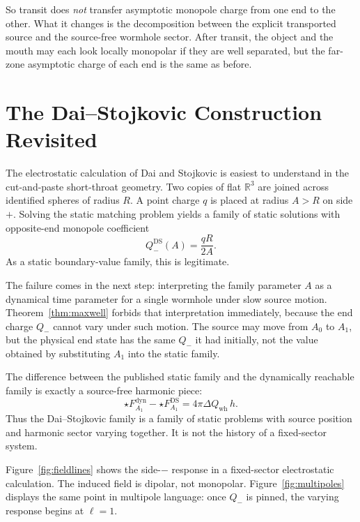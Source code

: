 \documentclass[aps,prd,onecolumn,nofootinbib,superscriptaddress]{revtex4-2}
\begin{document}
So transit does \emph{not} transfer asymptotic monopole charge from one end to the other. What it changes is the decomposition between the explicit transported source and the source-free wormhole sector. After transit, the object and the mouth may each look locally monopolar if they are well separated, but the far-zone asymptotic charge of each end is the same as before.

\section{The Dai--Stojkovic Construction Revisited}
\label{sec:ds}

The electrostatic calculation of Dai and Stojkovic is easiest to understand in the cut-and-paste short-throat geometry.\cite{DaiStojkovic2019Observing} Two copies of flat $\mathbb{R}^3$ are joined across identified spheres of radius $R$. A point charge $q$ is placed at radius $A>R$ on side $+$. Solving the static matching problem yields a family of static solutions with opposite-end monopole coefficient
\begin{equation}
Q_-^{\mathrm{DS}}(A)=\frac{qR}{2A}.
\end{equation}
As a static boundary-value family, this is legitimate.

The failure comes in the next step: interpreting the family parameter $A$ as a dynamical time parameter for a single wormhole under slow source motion. Theorem~\ref{thm:maxwell} forbids that interpretation immediately, because the end charge $Q_-$ cannot vary under such motion. The source may move from $A_0$ to $A_1$, but the physical end state has the same $Q_-$ it had initially, not the value obtained by substituting $A_1$ into the static family.

The difference between the published static family and the dynamically reachable family is exactly a source-free harmonic piece:
\begin{equation}
\star F^{\mathrm{dyn}}_{A_1}-\star F^{\mathrm{DS}}_{A_1}
=
4\pi \Delta Q_{\mathrm{wh}}\, h.
\end{equation}
Thus the Dai--Stojkovic family is a family of static problems with source position and harmonic sector varying together. It is not the history of a fixed-sector system.

Figure~\ref{fig:fieldlines} shows the side-$-$ response in a fixed-sector electrostatic calculation. The induced field is dipolar, not monopolar. Figure~\ref{fig:multipoles} displays the same point in multipole language: once $Q_-$ is pinned, the varying response begins at $\ell=1$.
\end{document}
